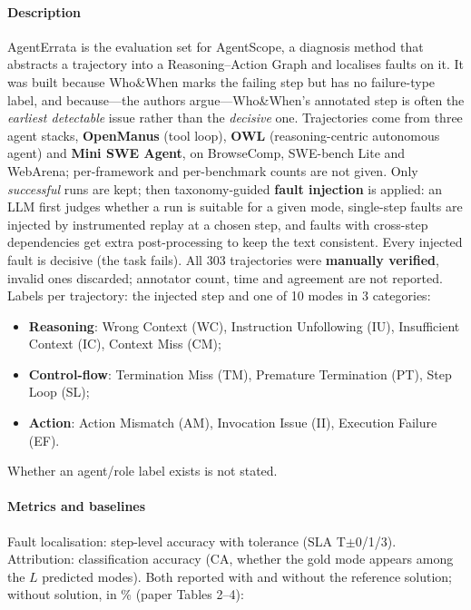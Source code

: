 \paragraph{Description} AgentErrata is the evaluation set for AgentScope, a diagnosis method that abstracts a trajectory into a Reasoning--Action Graph and localises faults on it. It was built because Who\&When marks the failing step but has no failure-type label, and because---the authors argue---Who\&When's annotated step is often the \emph{earliest detectable} issue rather than the \emph{decisive} one. Trajectories come from three agent stacks, \textbf{OpenManus} (tool loop), \textbf{OWL} (reasoning-centric autonomous agent) and \textbf{Mini SWE Agent}, on BrowseComp, SWE-bench Lite and WebArena; per-framework and per-benchmark counts are not given. Only \emph{successful} runs are kept; then taxonomy-guided \textbf{fault injection} is applied: an LLM first judges whether a run is suitable for a given mode, single-step faults are injected by instrumented replay at a chosen step, and faults with cross-step dependencies get extra post-processing to keep the text consistent. Every injected fault is decisive (the task fails). All 303 trajectories were \textbf{manually verified}, invalid ones discarded; annotator count, time and agreement are not reported. Labels per trajectory: the injected step and one of 10 modes in 3 categories:
\begin{itemize}
\item \textbf{Reasoning}: Wrong Context (WC), Instruction Unfollowing (IU), Insufficient Context (IC), Context Miss (CM);
\item \textbf{Control-flow}: Termination Miss (TM), Premature Termination (PT), Step Loop (SL);
\item \textbf{Action}: Action Mismatch (AM), Invocation Issue (II), Execution Failure (EF).
\end{itemize}
Whether an agent/role label exists is not stated.

\paragraph{Metrics and baselines} Fault localisation: step-level accuracy with tolerance (SLA T$\pm$0/1/3). Attribution: classification accuracy (CA, whether the gold mode appears among the $L$ predicted modes). Both reported with and without the reference solution; without solution, in \% (paper Tables 2--4):

